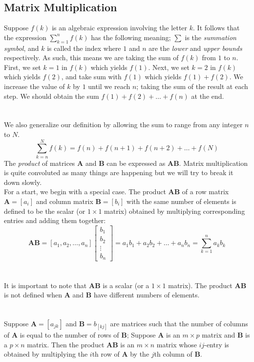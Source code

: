 \documentclass[../setup.tex]{subfiles}
\begin{document}
\subsection{Matrix Multiplication}
Suppose $f(k)$ is an algebraic expression involving the letter $k$. It follows that the expression $\sum\limits_{k = 1}^nf(k)$ has the following meaning; $\sum$ is the \textit{summation symbol}, and $k$ is called the index where $1$ and $n$ are the \textit{lower} and \textit{upper bounds} respectively. As such, this means we are taking the sum of $f(k)$ from $1$ to $n$. First, we set $k = 1$ in $f(k)$ which yields $f(1)$. Next, we set $k = 2$ in $f(k)$ which yields $f(2)$, and take sum with $f(1)$ which yields $f(1) + f(2)$. We increase the value of $k$ by $1$ until we reach $n$; taking the sum of the result at each step. We should obtain the sum $f(1) + f(2) + \dots + f(n)$ at the end. \\
\phantom \\ \\
We also generalize our definition by allowing the sum to range from any integer $n$ to $N$. \\
\[\sum^N_{k = n}f(k) = f(n) + f(n + 1) + f(n + 2) + \dots + f(N)\]
The \textit{product} of matrices $\bm{A}$ and $\bm{B}$ can be expressed as $\bm{AB}$. Matrix multiplication is quite convoluted as many things are happening but we will try to break it down slowly. \\
For a start, we begin with a special case. The product $\bm{AB}$ of a row matrix $\bm{A} = [a_{i}]$ and column matrix $\bm{B} = [b_i]$ with the same number of elements is defined to be the scalar (or $1 \times 1$ matrix) obtained by multiplying corresponding entries and adding them together:
\[\bm{AB} = [a_1, a_2, \dots, a_n]
\begin{bmatrix}
b_1 \\
b_2 \\
\vdots \\
b_n
\end{bmatrix}
= a_1b_1 + a_2b_2 + \dots + a_nb_n = \sum\limits_{k=1}^na_kb_k\] 
\phantom \\ \\
It is important to note that $\bm{AB}$ is a scalar (or a $1 \times 1$ matrix). The product $\bm{AB}$ is not defined when $\bm{A}$ and $\bm{B}$ have different numbers of elements. \\
\phantom \\ \\
Suppose $\bm{A} = [a_{jk}]$ and $\bm{B}  = b_[kj]$ are matrices such that the number of columns of $\bm{A}$ is equal to the number of rows of $\bm{B}$; Suppose $\bm{A}$ is an $m \times p$ matrix and $\bm{B}$ is a $p \times n$ matrix. Then the product $\bm{AB}$ is an $m \times n$ matrix whose $ij$-entry is obtained by multiplying the $i$th row of $\bm{A}$ by the $j$th column of $\bm{B}$.
\end{document}
